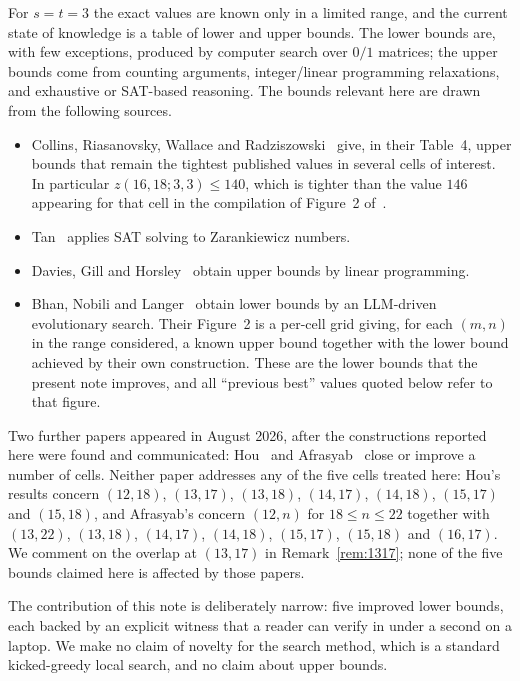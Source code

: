 \documentclass[11pt,reqno]{amsart}
\theoremstyle{plain}
\theoremstyle{remark}
\newcommand{\zz}{z}
\begin{document}
For $s=t=3$ the exact values are known only in a limited range, and the current state of knowledge is
a table of lower and upper bounds. The lower bounds are, with few exceptions, produced by computer
search over $0/1$ matrices; the upper bounds come from counting arguments, integer/linear programming
relaxations, and exhaustive or SAT-based reasoning. The bounds relevant here are drawn from the
following sources.

\begin{itemize}
\item Collins, Riasanovsky, Wallace and Radziszowski~\cite{CRWR16} give, in their Table~4, upper bounds
      that remain the tightest published values in several cells of interest. In particular
      $\zz(16,18;3,3)\le 140$, which is tighter than the value $146$ appearing for that cell in the
      compilation of Figure~2 of~\cite{BNL}.
\item Tan~\cite{Tan22} applies SAT solving to
      Zarankiewicz numbers.
\item Davies, Gill and Horsley~\cite{Dav24} obtain
      upper bounds by linear programming.
\item Bhan, Nobili and Langer~\cite{BNL} obtain lower bounds by an
      LLM-driven evolutionary search. Their Figure~2 is a per-cell grid giving, for each $(m,n)$ in
      the range considered, a known upper bound together with the lower bound achieved by their own
      construction. These are the lower bounds that the present note improves, and all
      ``previous best'' values quoted below refer to that figure.
\end{itemize}

Two further papers appeared in August 2026, after the constructions reported here were found and
communicated: Hou~\cite{Hou26} and
Afrasyab~\cite{Afr26} close or improve a number of
cells. Neither paper addresses any of the five cells treated here: Hou's results concern
$(12,18)$, $(13,17)$, $(13,18)$, $(14,17)$, $(14,18)$, $(15,17)$ and $(15,18)$, and Afrasyab's
concern $(12,n)$ for $18\le n\le 22$ together with $(13,22)$, $(13,18)$, $(14,17)$, $(14,18)$,
$(15,17)$, $(15,18)$ and $(16,17)$. We comment on the overlap at $(13,17)$ in
Remark~\ref{rem:1317}; none of the five bounds claimed here is affected by those papers.

The contribution of this note is deliberately narrow: five improved lower bounds, each backed by an
explicit witness that a reader can verify in under a second on a laptop. We make no claim of novelty
for the search method, which is a standard kicked-greedy local search, and no claim about upper
bounds.
\end{document}
